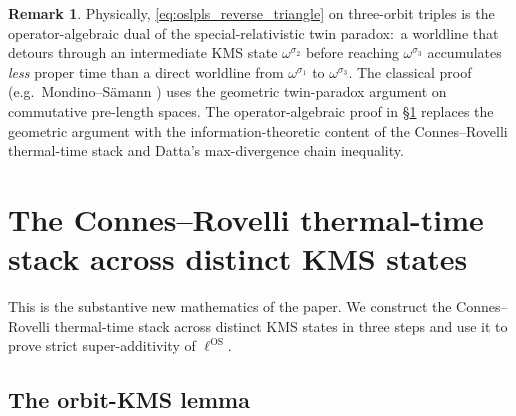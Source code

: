 \documentclass[11pt,a4paper]{article}
\theoremstyle{plain}
\theoremstyle{definition}
\newtheorem{remark}[theorem]{Remark}
\newcommand{\ellOS}{\ell^{\mathrm{OS}}}
\begin{document}
\begin{remark}\label{rem:twin_paradox_preview}
Physically, \eqref{eq:oslpls_reverse_triangle} on three-orbit triples
is the operator-algebraic dual of the special-relativistic twin
paradox:\ a worldline that detours through an intermediate KMS state
$\omega^{\sigma_{2}}$ before reaching $\omega^{\sigma_{3}}$ accumulates
\emph{less} proper time than a direct worldline from $\omega^{\sigma_{1}}$
to $\omega^{\sigma_{3}}$. The classical proof (e.g.\ Mondino--S\"amann
\cite{mondino_samann2025_pointed}) uses the geometric twin-paradox
argument on commutative pre-length spaces. The operator-algebraic
proof in \S\ref{sec:thermal_stack} replaces the geometric argument
with the information-theoretic content of the Connes--Rovelli
thermal-time stack and Datta's max-divergence chain inequality.
\end{remark}

\section{The Connes--Rovelli thermal-time stack across distinct KMS
states}\label{sec:thermal_stack}

This is the substantive new mathematics of the paper. We construct the
Connes--Rovelli thermal-time stack across distinct KMS states in three
steps and use it to prove strict super-additivity of $\ellOS$.

\subsection{The orbit-KMS lemma}\label{sec:orbit_kms}
\end{document}
